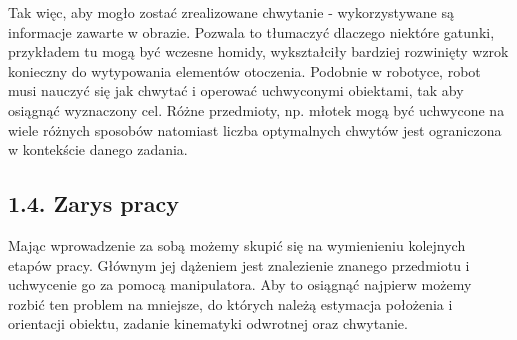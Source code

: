 \documentclass{article}
\begin{document}
Tak więc, aby mogło zostać zrealizowane chwytanie -  wykorzystywane są informacje zawarte w obrazie. Pozwala to tłumaczyć dlaczego niektóre gatunki, przykładem tu mogą być wczesne homidy, wykształciły bardziej rozwinięty wzrok konieczny do wytypowania elementów otoczenia. Podobnie w robotyce, robot musi nauczyć się jak chwytać i operować uchwyconymi obiektami, tak aby osiągnąć wyznaczony cel. Różne przedmioty, np. młotek mogą być uchwycone na wiele różnych sposobów natomiast liczba optymalnych chwytów jest ograniczona w kontekście danego zadania. 

\subsection*{\LARGE{1.4. Zarys pracy}} 

Mając wprowadzenie za sobą możemy skupić się na wymienieniu kolejnych etapów pracy. Głównym jej dążeniem jest znalezienie znanego przedmiotu i uchwycenie go za pomocą manipulatora. Aby to osiągnąć najpierw możemy rozbić ten problem na mniejsze, do których należą estymacja położenia i orientacji obiektu, zadanie kinematyki odwrotnej oraz chwytanie.
\end{document}
